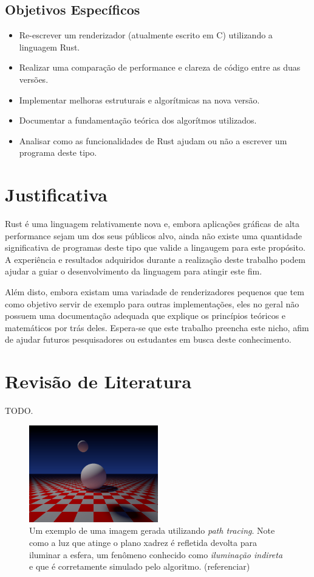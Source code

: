 \documentclass[12pt]{article}
\def\Cpp{{C\nolinebreak[4]\raisebox{.20ex}{\small\bf++}}}
\newcommand{\todo}[1]{\textsf{\color{red}#1}}
\begin{document}
\subsection{Objetivos Específicos}
\begin{itemize}
	\item Re-escrever um renderizador (atualmente escrito em \Cpp) utilizando a linguagem Rust.
	\item Realizar uma comparação de performance e clareza de código entre as duas versões.
	\item Implementar melhoras estruturais e algorítmicas na nova versão.
	\item Documentar a fundamentação teórica dos algorítmos utilizados.
	\item Analisar como as funcionalidades de Rust ajudam ou não a escrever um programa deste tipo.
\end{itemize}

\section{Justificativa}

Rust é uma linguagem relativamente nova e, embora aplicações gráficas de alta performance sejam um
dos seus públicos alvo, ainda não existe uma quantidade significativa de programas deste tipo que
valide a lingaugem para este propósito. A experiência e resultados adquiridos durante a realização
deste trabalho podem ajudar a guiar o desenvolvimento da linguagem para atingir este fim.

Além disto, embora existam uma variadade de renderizadores pequenos que tem como objetivo servir de
exemplo para outras implementações, eles no geral não possuem uma documentação adequada que explique
os princípios teóricos e matemáticos por trás deles. Espera-se que este trabalho preencha este
nicho, afim de ajudar futuros pesquisadores ou estudantes em busca deste conhecimento.

\section{Revisão de Literatura}

\todo{TODO.}

\begin{figure}
	\centering
	\includegraphics[width=0.5\textwidth]{exemplo_imagem}
	\caption{
		Um exemplo de uma imagem gerada utilizando \emph{path tracing}. Note como a luz que atinge o
		plano xadrez é refletida devolta para iluminar a esfera, um fenômeno conhecido como
		\emph{iluminação indireta} e que é corretamente simulado pelo algoritmo.
		\todo{(referenciar)}
	}
\end{figure}
\end{document}
